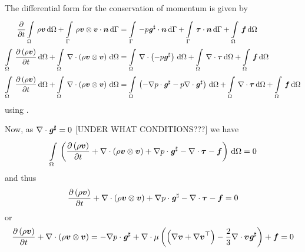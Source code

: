 The differential form for the conservation of momentum is given by
\begin{equation}
  \begin{split}
    \delby{}{t}\gint{\Omega}{}{\rho\vectr{v}}{\Omega}+
    \gint{\Gamma}{}{\dotprod{\tensorprod{\rho\vectr{v}}{\vectr{v}}}{\vectr{n}}}{\Gamma}
    &=\gint{\Gamma}{}{\dotprod{-p\sharptensor{\tensor{g}}}{\vectr{n}}}{\Gamma}
    +\gint{\Gamma}{}{\dotprod{\tensor{\tau}}{\vectr{n}}}{\Gamma}
    +\gint{\Omega}{}{\vectr{f}}{\Omega} \\
    \gint{\Omega}{}{\delby{\pbrac{\rho\vectr{v}}}{t}}{\Omega}
    +\gint{\Omega}{}{\divergence{}{\pbrac{\tensorprod{\rho\vectr{v}}{\vectr{v}}}}}{\Omega}
    &=\gint{\Omega}{}{\divergence{}{\pbrac{-p\sharptensor{\tensor{g}}}}}{\Omega}
    +\gint{\Omega}{}{\divergence{}{\tensor{\tau}}}{\Omega}
    +\gint{\Omega}{}{\vectr{f}}{\Omega}\\
    \gint{\Omega}{}{\delby{\pbrac{\rho\vectr{v}}}{t}}{\Omega}
    +\gint{\Omega}{}{\divergence{}{\pbrac{\tensorprod{\rho\vectr{v}}{\vectr{v}}}}}{\Omega}
    &=\gint{\Omega}{}{\pbrac{-\dotprod{\gradient{}{p}}{\sharptensor{\tensor{g}}}-p\divergence{}{\sharptensor{\tensor{g}}}}}{\Omega}+\gint{\Omega}{}{\divergence{}{\tensor{\tau}}}{\Omega}
    +\gint{\Omega}{}{\vectr{f}}{\Omega}\\
  \end{split}
\end{equation}
using .

Now, as $\divergence{}{\sharptensor{\tensor{g}}}=0$ [UNDER WHAT CONDITIONS???]
we have
\begin{equation}
  \gint{\Omega}{}{\pbrac{\delby{\pbrac{\rho\vectr{v}}}{t}
      +\divergence{}{\pbrac{\tensorprod{\rho\vectr{v}}{\vectr{v}}}}
      +\dotprod{\gradient{}{p}}{\sharptensor{\tensor{g}}}-\divergence{}{\tensor{\tau}}-\vectr{f}}}{\Omega}=0
\end{equation}
and thus
\begin{equation}
  \delby{\pbrac{\rho\vectr{v}}}{t}+\divergence{}{\pbrac{\tensorprod{\rho\vectr{v}}{\vectr{v}}}}
  +\dotprod{\gradient{}{p}}{\sharptensor{\tensor{g}}}-\divergence{}{\tensor{\tau}}-\vectr{f}=0
\end{equation}
or
\begin{equation}
  \delby{\pbrac{\rho\vectr{v}}}{t}+\divergence{}{\pbrac{\tensorprod{\rho\vectr{v}}{\vectr{v}}}}
  =-\dotprod{\gradient{}{p}}{\sharptensor{\tensor{g}}}+\divergence{}{\mu\pbrac{\pbrac{\gradient{}{\vectr{v}}
        +\transpose{\gradient{}{\vectr{v}}}}-\frac{2}{3}\divergence{}{\vectr{v}}
      \sharptensor{\tensor{g}}}}+\vectr{f}=0
  \label{eqn:NSEDifferentialConservationOfMomentum}
\end{equation}

